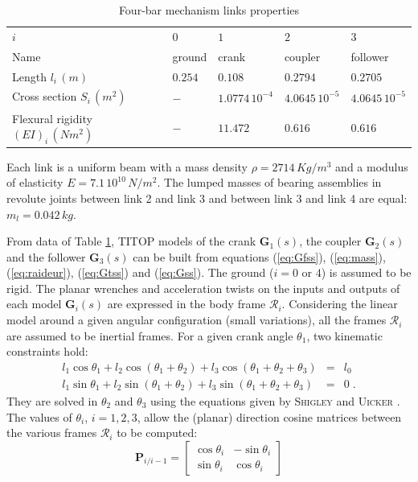 \documentclass[smallcondensed]{svjour3}     %
\begin{document}
\begin{table}[htbp!]
\caption{Four-bar mechanism links properties}
\label{tab:data}       %
\begin{tabular}{lllll}
\hline\noalign{\smallskip}
  $i$ & $0$ &  $1$ &  $2$ &  $3$  \\
\noalign{\smallskip}\hline\noalign{\smallskip}
Name & ground & crank & coupler & follower \\ 
Length $l_i\,(m)$ & $0.254$ & $0.108$ & $0.2794$ & $0.2705$\\
Cross section $S_i\,(m^2)$ & $-$ & $1.0774\,10^{-4}$ & $4.0645\,10^{-5}$ & $4.0645\,10^{-5}$ \\
Flexural rigidity $(EI)_i\,(Nm^2)$ & $-$ & $11.472$ & $0.616$ & $0.616$ \\
\hline
\end{tabular}
Each link is a uniform beam with a mass density $\rho=2714\,Kg/m^3$ and a modulus of elasticity $E=7.1\,10^{10}\,N/m^2$. The lumped masses of bearing assemblies in revolute joints between link 2 and link 3 and between link 3 and link 4 are equal: $m_l=0.042\,kg$.
\end{table}

From data of Table \ref{tab:data}, TITOP models of the crank $\mathbf{G}_1(s)$, the coupler  $\mathbf{G}_2(s)$ and the follower  $\mathbf{G}_3(s)$ can be built from equations (\ref{eq:Gfss}), (\ref{eq:mass}), (\ref{eq:raideur}), (\ref{eq:Gtss}) and (\ref{eq:Gss}).  The ground ($i=0$ or $4$) is assumed to be rigid. 
The planar wrenches and acceleration twists on the inputs and outputs of each model $\mathbf{G}_i(s)$ are expressed in the body frame $\mathcal{R}_i$.  Considering the linear model around a given angular configuration (small variations), all the frames $\mathcal{R}_i$ are assumed to be inertial frames. For a given crank angle $\theta_1$, two kinematic constraints hold:
\begin{eqnarray}\nonumber
l_1 \cos{\theta_1}+l_2 \cos{(\theta_1+\theta_2)}+l_3 \cos{(\theta_1+\theta_2+\theta_3)}&=&l_0 \\ \nonumber
l_1 \sin{\theta_1}+l_2 \sin{(\theta_1+\theta_2)}+l_3 \sin{(\theta_1+\theta_2+\theta_3)}&=&0\;.
\end{eqnarray}
They are solved in $\theta_2$ and $\theta_3$ using the equations given by \textsc{Shigley} and \textsc{Uicker} \cite{shigley1980}. The values of $\theta_i$, $i=1,2,3$, allow the (planar) direction cosine matrices between the various frames  $\mathcal{R}_i$ to be computed:
\[
\mathbf{P}_{i/i-1}=\left[\begin{array}{cc}\cos{\theta}_i & -\sin{\theta_i} \\ \sin{\theta_i} & \cos{\theta_i}\end{array}\right]
\]
\end{document}
